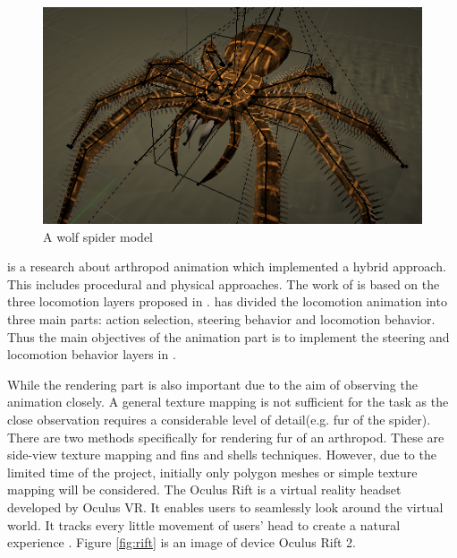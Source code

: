 
\begin{figure}[ht!]
\centering
\includegraphics[width=14cm]{figures/spiderModel.png}
\caption{A wolf spider model  \protect\footnotemark}
\label{fig:spiderModel}
\end{figure}

\cite{thesis} is a research about arthropod animation which implemented a hybrid approach. This includes procedural and physical approaches. The work of \cite{thesis} is based on the three locomotion layers proposed in \cite{steering}. \cite{steering} has divided the locomotion animation into three main parts: action selection, steering behavior and locomotion behavior. Thus the main objectives of the animation part is to implement the steering and locomotion behavior layers in \cite{steering}.

While the rendering part is also important due to the aim of observing the animation closely. A general texture mapping is not sufficient for the task as the close observation requires a considerable level of detail(e.g. fur of the spider). There are two methods specifically for rendering fur of an arthropod. These are side-view texture mapping and fins and shells techniques\cite{fur}. However, due to the limited time of the project, initially only polygon meshes or simple texture mapping will be considered.
The Oculus Rift is a virtual reality headset developed by Oculus VR. It enables users to seamlessly look around the virtual world. It tracks every little movement of users' head to create a natural experience \cite{rift1}. Figure \ref{fig:rift} is an image of device Oculus Rift 2.



